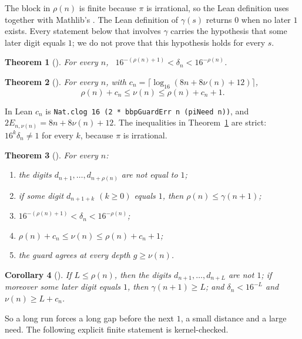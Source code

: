 \documentclass[11pt]{amsart}
\newtheorem{theorem}{Theorem}[section]
\newtheorem{corollary}[theorem]{Corollary}
\theoremstyle{definition}
\theoremstyle{remark}
\newcommand{\dist}{\delta}
\newcommand{\need}{\nu}
\newcommand{\run}{\rho}
\newcommand{\gap}{\gamma}
\begin{document}
The block in $\run(n)$ is finite because $\pi$ is irrational, so the Lean
definition uses  together with Mathlib's .
The Lean definition of $\gap(s)$ returns $0$ when no later $1$ exists. Every
statement below that involves $\gap$ carries the hypothesis that some later
digit equals $1$; we do not prove that this hypothesis holds for every $s$.

\begin{theorem}[]\label{thm:distrun}
For every $n$, \ $16^{-(\run(n)+1)}<\dist_n<16^{-\run(n)}$.
\end{theorem}

\begin{theorem}[]\label{thm:needbounds}
For every $n$, with $c_n=\lceil\log_{16}(8n+8\need(n)+12)\rceil$,
\[
  \run(n)+c_n\le\need(n)\le\run(n)+c_n+1 .
\]
\end{theorem}

In Lean $c_n$ is \texttt{Nat.clog~16 (2~*~bbpGuardErr~n (piNeed~n))}, and
$2E_{n,\need(n)}=8n+8\need(n)+12$. The inequalities in
Theorem~\ref{thm:distrun} are strict: $16^k\dist_n\ne1$ for every $k$,
because $\pi$ is irrational.

\begin{theorem}[]\label{thm:chain}
For every $n$:
\begin{enumerate}
\item the digits $d_{n+1},\dots,d_{n+\run(n)}$ are not equal to $1$;
\item if some digit $d_{n+1+k}$ $(k\ge0)$ equals $1$, then
  $\run(n)\le\gap(n+1)$;
\item $16^{-(\run(n)+1)}<\dist_n<16^{-\run(n)}$;
\item $\run(n)+c_n\le\need(n)\le\run(n)+c_n+1$;
\item the guard agrees at every depth $g\ge\need(n)$.
\end{enumerate}
\end{theorem}

\begin{corollary}[]
If $L\le\run(n)$, then the digits $d_{n+1},\dots,d_{n+L}$ are not $1$; if
moreover some later digit equals $1$, then $\gap(n+1)\ge L$; and
$\dist_n<16^{-L}$ and $\need(n)\ge L+c_n$.
\end{corollary}

So a long run forces a long gap before the next $1$, a small distance and a
large need. The following explicit finite statement is kernel-checked.
\end{document}
